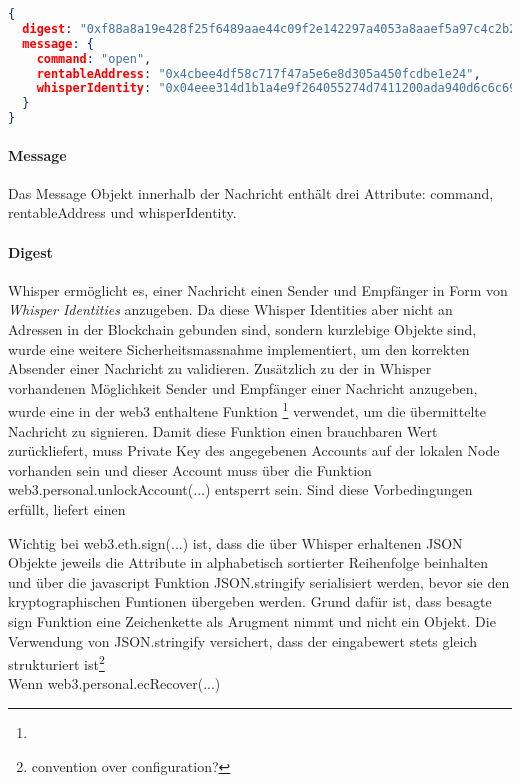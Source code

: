 \begin{lstlisting}[language=json,caption=Beispiel einer Real-Time Nachricht via Whisper Protokoll]
{
  digest: "0xf88a8a19e428f25f6489aae44c09f2e142297a4053a8aaef5a97c4c2b246c89477a2fc16365a0ec05a466e23b403ac1370eedc5e90032ca007d742edfad83eb11b",
  message: {
    command: "open",
    rentableAddress: "0x4cbee4df58c717f47a5e6e8d305a450fcdbe1e24",
    whisperIdentity: "0x04eee314d1b1a4e9f264055274d7411200ada940d6c6c698d53bf40b41ff0f527775a8dfd11867fe64d389ab7cb9809f8df08f561a2498fdd9c9d5c6556913f598"
  }
}
\end{lstlisting}

\paragraph{Message}
\label{para:Message}
Das Message Objekt innerhalb der Nachricht enthält drei Attribute: command, rentableAddress und whisperIdentity.

\paragraph{Digest}
\label{para:Digest}
Whisper ermöglicht es, einer Nachricht einen Sender und Empfänger in Form von \emph{Whisper Identities} anzugeben. Da diese Whisper Identities aber nicht an Adressen in der Blockchain gebunden sind, sondern kurzlebige Objekte sind, wurde eine weitere Sicherheitsmassnahme implementiert, um den korrekten Absender einer Nachricht zu validieren.
Zusätzlich zu der in Whisper vorhandenen Möglichkeit Sender und Empfänger einer Nachricht anzugeben, wurde eine in der web3 enthaltene Funktion \footnote{} verwendet, um die übermittelte Nachricht zu signieren. Damit diese Funktion einen brauchbaren Wert zurückliefert, muss Private Key des angegebenen Accounts auf der lokalen Node vorhanden sein und dieser Account muss über die Funktion web3.personal.unlockAccount(...) entsperrt sein. Sind diese Vorbedingungen erfüllt, liefert  einen 

Wichtig bei web3.eth.sign(...) ist, dass die über Whisper erhaltenen JSON Objekte jeweils die Attribute in alphabetisch sortierter Reihenfolge beinhalten und über die javascript Funktion JSON.stringify serialisiert werden, bevor sie den kryptographischen Funtionen übergeben werden. Grund dafür ist, dass besagte sign Funktion eine Zeichenkette als Arugment nimmt und nicht ein Objekt. Die Verwendung von JSON.stringify versichert, dass der eingabewert stets gleich strukturiert ist\footnote{convention over configuration?}
\\Wenn web3.personal.ecRecover(...)


